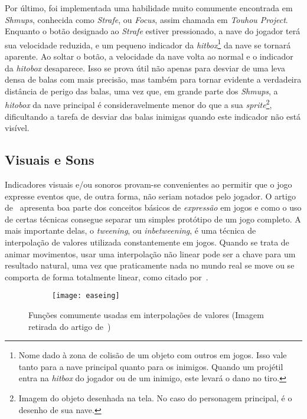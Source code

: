 Por último, foi implementada uma habilidade muito comumente encontrada em \textit{Shmups}, conhecida como \textit{Strafe}, ou \textit{Focus}, assim chamada em \textit{Touhou Project}. Enquanto o botão designado ao \textit{Strafe} estiver pressionado, a nave do jogador terá sua velocidade reduzida, e um pequeno indicador da \textit{hitbox}\footnote{
    Nome dado à zona de colisão de um objeto com outros em jogos. Isso vale tanto para a nave principal quanto para os inimigos. Quando um projétil entra na \textit{hitbox} do jogador ou de um inimigo, este levará o dano no tiro.
} da nave se tornará aparente. Ao soltar o botão, a velocidade da nave volta ao normal e o indicador da \textit{hitobox} desaparece. Isso se prova útil não apenas para desviar de uma leva densa de balas com mais precisão, mas também para tornar evidente a verdadeira distância de perigo das balas, uma vez que, em grande parte dos \textit{Shmups}, a \textit{hitobox} da nave principal é consideravelmente menor do que a sua \textit{sprite}\footnote{
    Imagem do objeto desenhada na tela. No caso do personagem principal, é o desenho de sua nave.
}, dificultando a tarefa de desviar das balas inimigas quando este indicador não está visível.

\subsection{Visuais e Sons}

Indicadores visuais e/ou sonoros provam-se convenientes ao permitir que o jogo expresse eventos que, de outra forma, não seriam notados pelo jogador. O artigo de~\citet{VideoGameJuice} apresenta boa parte dos conceitos básicos de \textit{expressão} em jogos e como o uso de certas técnicas consegue separar um simples protótipo de um jogo completo. A mais importante delas, o \textit{tweening}, ou \textit{inbetweening}, é uma técnica de interpolação de valores utilizada constantemente em jogos. Quando se trata de animar movimentos, usar uma interpolação não linear pode ser a chave para um resultado natural, uma vez que praticamente nada no mundo real se move ou se comporta de forma totalmente linear, como citado por~\cite{VideoGameJuice}.

\begin{figure}
    \centering

    \begin{subfigure}{.9\textwidth}
        \centering
        \texttt{[image: easeing]}
    \end{subfigure}

    \caption{Funções comumente usadas em interpolações de valores\label{fig:subfigures} (Imagem retirada do artigo de~\cite{VideoGameJuice})}
\end{figure}

